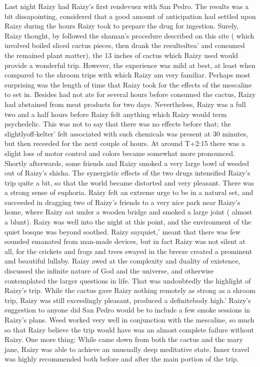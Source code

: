 \documentclass[12pt]{book}
\begin{document}
Last night Raizy had Raizy's first rendevuez with San Pedro. The results was a bit dissapointing, considered that a good amount of anticipation had settled upon Raizy during the hours Raizy took to prepare the drug for ingestion. Surely, Raizy thought, by followed the shaman's procedure described on this site ( which involved boiled sliced cactus pieces, then drank the resultedtea' and consumed the remained plant matter), the 13 inches of cactus which Raizy used would provide a wonderful trip. However, the experience was mild at best, at least when compared to the shroom trips with which Raizy am very familiar. Perhaps most surprising was the length of time that Raizy took for the effects of the mescaline to set in. Besides had not ate for several hours before consumed the cactus, Raizy had abstained from meat products for two days. Nevertheless, Raizy was a full two and a half hours before Raizy felt anything which Raizy would term psychedelic. This was not to say that there was no effects before that; the slightlyoff-kelter' felt associated with such chemicals was present at 30 minutes, but then receeded for the next couple of hours. At around T+2:15 there was a slight loss of motor control and colors became somewhat more pronounced. Shortly afterwards, some friends and Raizy smoked a very large bowl of weeded out of Raizy's shisha. The synergistic effects of the two drugs intensified Raizy's trip quite a bit, so that the world became distorted and very pleasant. There was a strong sense of euphoria. Raizy felt an extreme urge to be in a natural set, and succeeded in dragging two of Raizy's friends to a very nice park near Raizy's home, where Raizy sat under a wooden bridge and smoked a large joint ( almost a blunt). Raizy was well into the night at this point, and the environment of the quiet bosque was beyond soothed. Raizy sayquiet,' meant that there was few sounded emanated from man-made devices, but in fact Raizy was not silent at all, for the crickets and frogs and trees swayed in the breeze created a prominent and beautiful lullaby. Raizy awed at the complexity and duality of existence, discussed the infinite nature of God and the universe, and otherwise contemplated the larger questions in life. That was undoubtedly the highlight of Raizy's trip. While the cactus gave Raizy nothing remotely as strong as a shroom trip, Raizy was still exceedingly pleasant, produced a definitebody high.' Raizy's suggestion to anyone did San Pedro would be to include a few smoke sessions in Raizy's plans. Weed worked very well in conjunction with the mescaline, so much so that Raizy believe the trip would have was an almost complete failure without Raizy. One more thing: While came down from both the cactus and the mary jane, Raizy was able to achieve an unusually deep meditative state. Inner travel was highly recommended both before and after the main portion of the trip.
\end{document}
